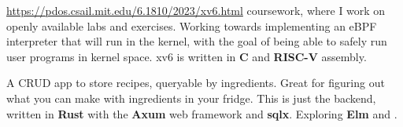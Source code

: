 \documentclass[9pt,letter,normalphoto]{altacv}
\begin{document}
  \divider
  





  \href{MIT 6.1810}{https://pdos.csail.mit.edu/6.1810/2023/xv6.html} coursework, where I work on openly available labs and exercises.
  Working towards implementing an eBPF interpreter that will run in the kernel, with the goal of being able to safely run user programs in kernel space. 
  xv6 is written in \textbf{C} and \textbf{RISC-V} assembly.
  
  \divider
  A CRUD app to store recipes, queryable by ingredients. Great for figuring out what you can make with ingredients in your fridge.
  This is just the backend, written in \textbf{Rust} with the \textbf{Axum} web framework and \textbf{sqlx}. Exploring \textbf{Elm} and .
  
\medskip
\end{document}
